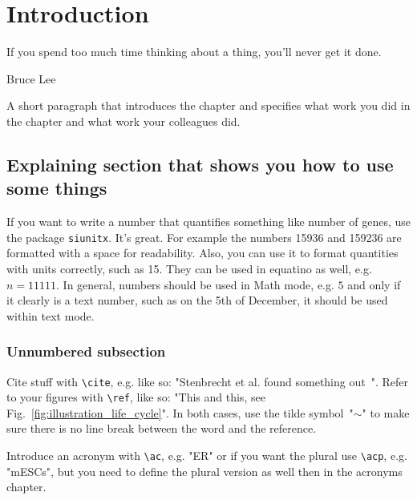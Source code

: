 \chapter[Introduction]{Introduction}
\label{chap:introduction}

\epigraph{If you spend too much time thinking about a thing, you'll never get it done.}{Bruce Lee}

\noindent A short paragraph that introduces the chapter and specifies what work you did in the chapter and what work your colleagues did. 




\section[Explainer]{Explaining section that shows you how to use some things}

If you want to write a number that quantifies something like number of genes, use the package \texttt{siunitx}. It's great. For example the numbers \num{15936} and \num{159236} are formatted with a space for readability. Also, you can use it to format quantities with units correctly, such as \qty{15}{\min}. They can be used in equatino as well, e.g. $n = \num{11111}$. In general, numbers should be used in Math mode, e.g. $5$ and only if it clearly is a text number, such as on the 5th of December, it should be used within text mode.

\subsection*{Unnumbered subsection}

Cite stuff with \texttt{\textbackslash{}cite}, e.g. like so: "Stenbrecht et al. found something out~\cite{steinbrecht_2024}". Refer to your figures with \texttt{\textbackslash{}ref}, like so: "This and this, see Fig.~\ref{fig:illustration_life_cycle}". In both cases, use the tilde symbol~"$\sim$" to make sure there is no line break between the word and the reference. 

Introduce an acronym with \texttt{\textbackslash{}ac}, e.g. "\ac{ER}" or if you want the plural use \texttt{\textbackslash{}acp}, e.g. "\acp{mESC}", but you need to define the  plural version as well then in the acronyms chapter.

